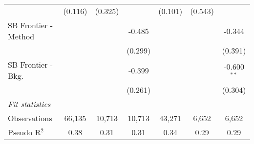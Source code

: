 \begin{tabular}{lcccccc}
                        & (0.116) & (0.325) &              & (0.101) & (0.543) &   \\   
   SB Frontier - Method &         &         & -0.485       &         &         & -0.344\\   
                        &         &         & (0.299)      &         &         & (0.391)\\   
   SB Frontier - Bkg.   &         &         & -0.399       &         &         & -0.600$^{**}$\\   
                        &         &         & (0.261)      &         &         & (0.304)\\   
   \midrule
   \emph{Fit statistics}\\
   Observations         & 66,135  & 10,713  & 10,713       & 43,271  & 6,652   & 6,652\\  
   Pseudo R$^2$         & 0.38    & 0.31    & 0.31         & 0.34    & 0.29    & 0.29\\  
   

\end{tabular}
